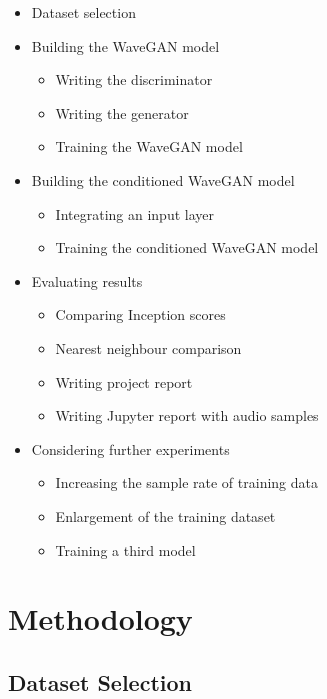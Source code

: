 \documentclass[a4paper, dvipsnames, titlepage]{article}
\begin{document}
\begin{itemize}
\item Dataset selection
\item Building the WaveGAN model
  \begin{itemize}
  \item Writing the discriminator
  \item Writing the generator
  \item Training the WaveGAN model
  \end{itemize}
\item Building the conditioned WaveGAN model
  \begin{itemize}
  \item Integrating an input layer
  \item Training the conditioned WaveGAN model
  \end{itemize}
\item Evaluating results
  \begin{itemize}
  \item Comparing Inception scores
  \item Nearest neighbour comparison
  \item Writing project report
  \item Writing Jupyter report with audio samples
  \end{itemize}
\item Considering further experiments
  \begin{itemize}
  \item Increasing the sample rate of training data
  \item Enlargement of the training dataset
  \item Training a third model
  \end{itemize}
\end{itemize}

\newpage

\section{Methodology}

\subsection{Dataset Selection}
\end{document}
